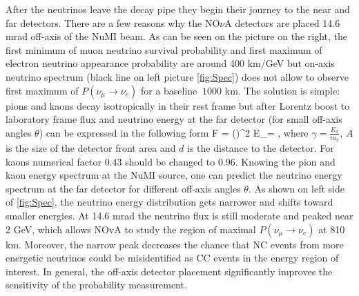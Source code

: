 After the neutrinos leave the decay pipe they begin their journey to the near and far detectors. 
There are a few reasons why the NO$\nu$A detectors are placed 14.6 mrad off-axis of the NuMI beam. 
As can be seen on the picture on the right, the first minimum of muon neutrino survival 
probability and first maximum of electron neutrino appearance probability are around 400 km/GeV 
but on-axis neutrino spectrum (black line on left picture \ref{fig:Spec}) does not allow to observe 
first maximum of $P(\nu_\mu \rightarrow \nu_e)$ for a baseline $~1000$ km. The solution is 
simple: pions and kaons decay isotropically in their rest frame but after Lorentz boost to 
laboratory frame flux and neutrino energy at the far detector (for small off-axis angles $\theta$) 
can be expressed in the following form
\be
F = \Big(\Big)^2
\ee
\be
E_\nu = ,
\ee
where $\gamma = \frac{E_\pi}{m_\pi}$, $A$ is the size of the detector front area and $d$ is 
the distance to the detector. For kaons numerical factor $0.43$ should be changed to $0.96$. 
Knowing the pion and kaon energy spectrum at the NuMI source, one can predict the neutrino energy 
spectrum at the far detector for different off-axis angles $\theta$. As shown on left side of 
\autoref{fig:Spec}, the neutrino energy distribution gets narrower and shifts toward smaller energies. 
At 14.6 mrad the neutrino flux is still moderate and peaked near 2 GeV, which allows NOvA 
to study the region of maximal $P(\nu_\mu \rightarrow \nu_e)$ at 810 km. Moreover, the narrow 
peak decreases the chance that NC events from more energetic neutrinos could be misidentified 
as CC events in the energy region of interest. In general, the off-axis detector placement 
significantly improves the sensitivity of the probability measurement.
